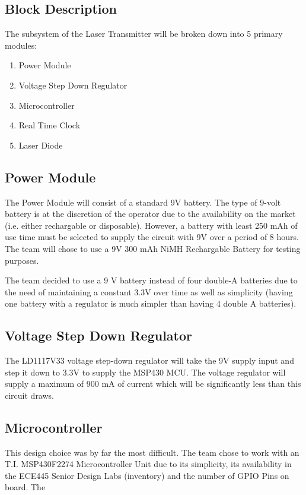 \documentclass[openbib,letterpaper,10pt]{article}
\begin{document}
\begin{spacing}{1.15}
\section{Block Description}
The subsystem of the Laser Transmitter will be broken down into 5 primary modules:
\begin{enumerate}
	\item Power Module
	\item Voltage Step Down Regulator
	\item Microcontroller 
	\item Real Time Clock
	\item Laser Diode
\end{enumerate}

\subsection*{Power Module}
The Power Module will consist of a standard 9V battery. The type of 9-volt battery is at the discretion of the operator due to the availability on the market (i.e. either rechargable or disposable). However, a battery with least 250 mAh of use time must be selected to supply the circuit with 9V over a period of 8 hours. The team will chose to use a 9V 300 mAh NiMH Rechargable Battery for testing purposes.

The team decided to use a 9 V battery instead of four double-A batteries due to the need of maintaining a constant 3.3V over time as well as simplicity (having one battery with a regulator is much simpler than having 4 double A batteries).

\subsection*{Voltage Step Down Regulator}
The LD1117V33 voltage step-down regulator will take the 9V supply input and step it down to 3.3V to supply the MSP430 MCU. The voltage regulator will supply a maximum of 900 mA of current which will be significantly less than this circuit draws.

\subsection*{Microcontroller}
This design choice was by far the most difficult. The team chose to work with an T.I. MSP430F2274 Microcontroller Unit due to its simplicity, its availability in the ECE445 Senior Design Labs (inventory) and the number of GPIO Pins on board. The 


\end{spacing}
\end{document}
